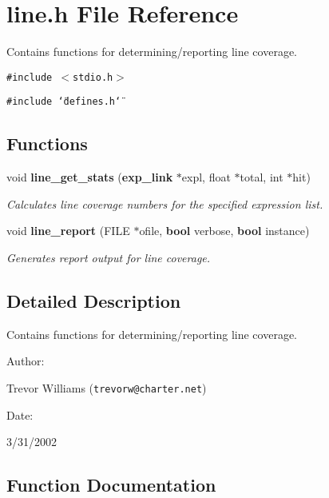 \section{line.h File Reference}
\label{line_8h}
Contains functions for determining/reporting line coverage. 


{\tt \#include $<$stdio.h$>$}\par
{\tt \#include \char`\"{}defines.h\char`\"{}}\par
\subsection*{Functions}
\begin{CompactItemize}
\item 
void {\bf line\_\-get\_\-stats} ({\bf exp\_\-link} $\ast$expl, float $\ast$total, int $\ast$hit)
\begin{CompactList}\small\item\em Calculates line coverage numbers for the specified expression list.\item\end{CompactList}\item 
void {\bf line\_\-report} (FILE $\ast$ofile, {\bf bool} verbose, {\bf bool} instance)
\begin{CompactList}\small\item\em Generates report output for line coverage.\item\end{CompactList}\end{CompactItemize}


\subsection{Detailed Description}
Contains functions for determining/reporting line coverage.



\begin{Desc}
\item[Author: ]\par
Trevor Williams ({\tt trevorw@charter.net}) \end{Desc}
\begin{Desc}
\item[Date: ]\par
3/31/2002\end{Desc}


\subsection{Function Documentation}
